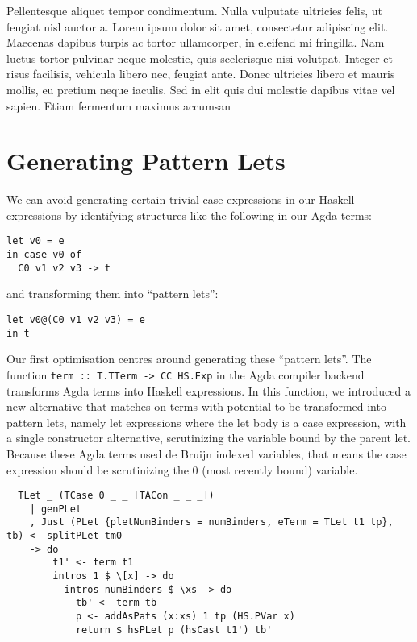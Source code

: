 Pellentesque aliquet tempor condimentum. Nulla vulputate ultricies felis, ut feugiat nisl auctor a. Lorem ipsum dolor sit amet, consectetur adipiscing elit. Maecenas dapibus turpis ac tortor ullamcorper, in eleifend mi fringilla. Nam luctus tortor pulvinar neque molestie, quis scelerisque nisi volutpat. Integer et risus facilisis, vehicula libero nec, feugiat ante. Donec ultricies libero et mauris mollis, eu pretium neque iaculis. Sed in elit quis dui molestie dapibus vitae vel sapien. Etiam fermentum maximus accumsan



\section{Generating Pattern Lets}

We can avoid generating certain trivial case expressions in our Haskell expressions by identifying structures like the following in our Agda terms:

\begin{lstlisting}
let v0 = e
in case v0 of
  C0 v1 v2 v3 -> t
\end{lstlisting}

and transforming them into ``pattern lets'':

\begin{lstlisting}
let v0@(C0 v1 v2 v3) = e
in t
\end{lstlisting}

Our first optimisation centres around generating these ``pattern lets''. The function \lstinline{term :: T.TTerm -> CC HS.Exp} in the Agda compiler backend transforms Agda terms into Haskell expressions. In this function, we introduced a new alternative that matches on terms with potential to be transformed into pattern lets, namely let expressions where the let body is a case expression, with a single constructor alternative, scrutinizing the variable bound by the parent let. Because these Agda terms used de Bruijn indexed variables, that means the case expression should be scrutinizing the 0 (most recently bound) variable.

\begin{lstlisting}
  TLet _ (TCase 0 _ _ [TACon _ _ _])
    | genPLet
    , Just (PLet {pletNumBinders = numBinders, eTerm = TLet t1 tp}, tb) <- splitPLet tm0
    -> do
        t1' <- term t1
        intros 1 $ \[x] -> do
          intros numBinders $ \xs -> do
            tb' <- term tb
            p <- addAsPats (x:xs) 1 tp (HS.PVar x)
            return $ hsPLet p (hsCast t1') tb'
\end{lstlisting}

